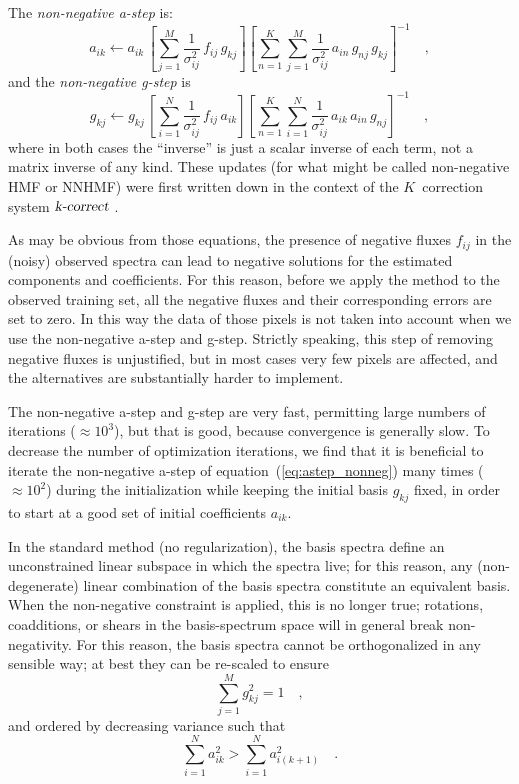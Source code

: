 \documentclass[12pt,preprint]{aastex}
\newcommand{\equationname}{equation}
\begin{document}
The \emph{non-negative a-step} is:
\begin{equation}\label{eq:astep_nonneg}
a_{ik} \gets a_{ik}\,\left[\sum_{j=1}^{M}\frac{1}{\sigma^2_{ij}}\,f_{ij}\,g_{kj}\right]\left[\sum_{n=1}^{K}\sum_{j=1}^{M}\frac{1}{\sigma^2_{ij}}\,a_{in}\,g_{nj}\,g_{kj}\right]^{-1}
\quad ,
\end{equation}
and the \emph{non-negative g-step} is
\begin{equation}\label{eq:gstep_nonneg}
g_{kj} \gets g_{kj}\,\left[\sum_{i=1}^{N}\frac{1}{\sigma^2_{ij}}\,f_{ij}\,a_{ik}\right]\left[\sum_{n=1}^{K}\sum_{i=1}^{N}\frac{1}{\sigma^2_{ij}}\,a_{ik}\,a_{in}\,g_{nj}\right]^{-1}
\quad ,
\end{equation}
where in both cases the ``inverse'' is just a scalar inverse of each
term, not a matrix inverse of any kind.  These updates (for what might
be called non-negative HMF or NNHMF) were first written down in the
context of the $K$~correction system $\textsl{k-correct}$
\citep{blanton}.

As may be obvious from those equations, the presence of negative
fluxes $f_{ij}$ in the (noisy) observed spectra can lead to negative
solutions for the estimated components and coefficients. For this
reason, before we apply the method to the observed training set, all
the negative fluxes and their corresponding errors are set to zero. In
this way the data of those pixels is not taken into account when we
use the non-negative a-step and g-step.  Strictly speaking, this step
of removing negative fluxes is unjustified, but in most cases very few
pixels are affected, and the alternatives are substantially harder to
implement.

The non-negative a-step and g-step are very fast, permitting large
numbers of iterations ($\approx 10^3$), but that is good, because
convergence is generally slow.  To decrease the number of optimization
iterations, we find that it is beneficial to iterate the non-negative
a-step of \equationname~(\ref{eq:astep_nonneg}) many times ($\approx
10^2$) during the initialization while keeping the initial basis
$g_{kj}$ fixed, in order to start at a good set of initial
coefficients $a_{ik}$.

In the standard method (no regularization), the basis spectra define
an unconstrained linear subspace in which the spectra live; for this
reason, any (non-degenerate) linear combination of the basis spectra
constitute an equivalent basis.  When the non-negative constraint is
applied, this is no longer true; rotations, coadditions, or shears in
the basis-spectrum space will in general break non-negativity.  For
this reason, the basis spectra cannot be orthogonalized in any sensible 
way; at best they can be re-scaled to ensure
\begin{equation}\label{eq:nnnormalization}
\sum_{j=1}^{M}g_{kj}^2 = 1
\quad ,
\end{equation}
and ordered by decreasing variance such that
\begin{equation}\label{eq:nnordering}
\sum_{i=1}^{N}a_{ik}^2>\sum_{i=1}^{N}a_{i(k+1)}^2
\quad .
\end{equation}
\end{document}
